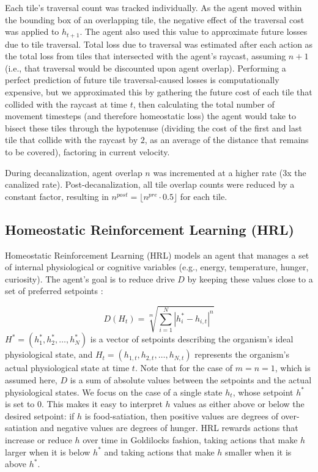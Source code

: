 \documentclass[12pt,fleqn]{article}
\begin{document}
Each tile's traversal count was tracked individually. As the agent moved within the bounding box of an overlapping tile, the negative effect of the traversal cost was applied to \(h_{t+1}\). The agent also used this value to approximate future losses due to tile traversal. Total loss due to traversal was estimated after each action as the total loss from tiles that intersected with the agent's raycast, assuming \(n+1\) (i.e., that traversal would be discounted upon agent overlap). Performing a perfect prediction of future tile traversal-caused losses is computationally expensive, but we approximated this by gathering the future cost of each tile that collided with the raycast at time \(t\), then calculating the total number of movement timesteps (and therefore homeostatic loss) the agent would take to bisect these tiles through the hypotenuse (dividing the cost of the first and last tile that collide with the raycast by \(2\), as an average of the distance that remains to be covered), factoring in current velocity.

During decanalization, agent overlap \(n\) was incremented at a higher rate (3x the canalized rate). Post-decanalization, all tile overlap counts were reduced by a constant factor, resulting in \(n^{post} = \lfloor n^{pre} \cdot 0.5 \rfloor\) for each tile.

\subsection{Homeostatic Reinforcement Learning (HRL)}

Homeostatic Reinforcement Learning (HRL) models an agent that manages a set of internal physiological or cognitive variables (e.g., energy, temperature, hunger, curiosity). The agent's goal is to reduce drive $D$ by keeping these values close to a set of preferred setpoints \cite{keramati_homeostatic_2014}:

\begin{equation}\label{eq:model-drive}
  D\left(H_t\right)=\sqrt[m]{\sum_{i=1}^N\left|h_i^*-h_{i, t}\right|^n}
\end{equation}
\(H^*=\left(h_1^*, h_2^*, \ldots, h_N^*\right)\) is a vector of setpoints describing the organism's ideal physiological state, and \(H_t=\left(h_{1, t}, h_{2, t}, \ldots, h_{N, t}\right)\) represents the organism's actual physiological state at time \(t\). Note that for the case of $m = n = 1$, which is assumed here, $D$ is a sum of absolute values between the setpoints and the actual physiological states. We focus on the case of a single state \(h_t\), whose setpoint \(h^*\) is set to \(0\). This makes it easy to interpret $h$ values as either above or below the desired setpoint: if $h$ is food-satiation, then positive values are degrees of over-satiation and negative values are degrees of hunger. HRL rewards actions that increase or reduce $h$ over time in Goldilocks fashion, taking actions that make $h$ larger when it is below \(h^*\) and taking actions that make $h$ smaller when it is above \(h^*\).
\end{document}
